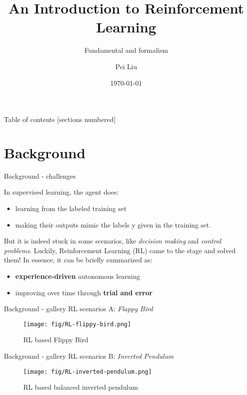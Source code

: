 \documentclass[10pt]{beamer}
\title{An Introduction to Reinforcement Learning}
\subtitle{Fundamental and formalism}
\date{\today}
\author{Pei Liu}
\institute{Department of Computer Science @UESTC}
\begin{document}
\maketitle

\begin{frame}{Table of contents}
  [sections numbered]
  \tableofcontents[hideallsubsections]
\end{frame}

\section{Background}

\begin{frame}[fragile]{Background - challenges}
  
  In supervised learning, the agent does:
  \begin{itemize}
    \item learning from the labeled training set
    \item making their outputs mimic the labels y given in the training set.
  \end{itemize}

  But it is indeed stuck in some scenarios, like \emph{decision making} and \emph{control problems}.  Luckily, \alert{Reinforcement Learning (RL)} came to the stage and solved them! In essence, it can be briefly summarized as:
  \begin{itemize}
    \item \textbf{experience-driven} autonomous learning
    \item improving over time through \textbf{trial and error}
  \end{itemize}
 
\end{frame}

\begin{frame}[fragile]{Background - gallery}
  RL scenarios A: \textit{Flappy Bird}
  \begin{figure}[htbp]
    \centering
    \texttt{[image: fig/RL-flippy-bird.png]}
    \caption{RL based Flippy Bird}
  \end{figure}
\end{frame}

\begin{frame}[fragile]{Background - gallery}
  RL scenarios B: \textit{Inverted Pendulum}
  \begin{figure}[htbp]
    \centering
    \texttt{[image: fig/RL-inverted-pendulum.png]}
    \caption{RL based balanced inverted pendulum}
  \end{figure}
\end{frame}
\end{document}
